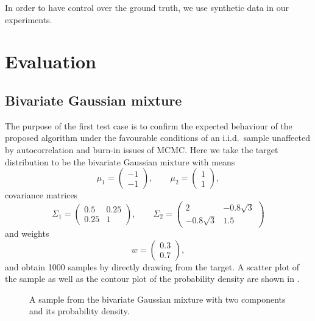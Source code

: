 \documentclass[11pt,a4paper]{report}
\begin{document}
In order to have control over the ground truth, we use synthetic data in our experiments.

\section{Evaluation}

\subsection{Bivariate Gaussian mixture}
\label{sec:gaussian-mixture}

The purpose of the first test case is to confirm the expected behaviour of the proposed algorithm under the favourable conditions of an i.i.d.\ sample unaffected by autocorrelation and burn-in issues of MCMC. Here we take the target distribution to be the bivariate Gaussian mixture with means 
$$
\mu_1 = \begin{pmatrix} -1 \\ -1 \end{pmatrix}, \qquad
\mu_2 = \begin{pmatrix} 1 \\ 1 \end{pmatrix},
$$
covariance matrices
$$
\Sigma_1 = \begin{pmatrix}
0.5 & 0.25\\
0.25 & 1
\end{pmatrix}, \qquad
\Sigma_2 = \begin{pmatrix}
2 & -0.8 \sqrt{3}\\
-0.8 \sqrt{3} & 1.5
\end{pmatrix}
$$
and weights
$$w = \begin{pmatrix} 0.3 \\ 0.7 \end{pmatrix},$$
and obtain 1000 samples by directly drawing from the target. A scatter plot of the sample as well as the contour plot of the probability density are shown in .

\begin{figure}[t]
\centering
{}
\caption{A sample from the bivariate Gaussian mixture with two components and its probability density.
\label{fig:gmm:sample}}
\end{figure}
\end{document}
